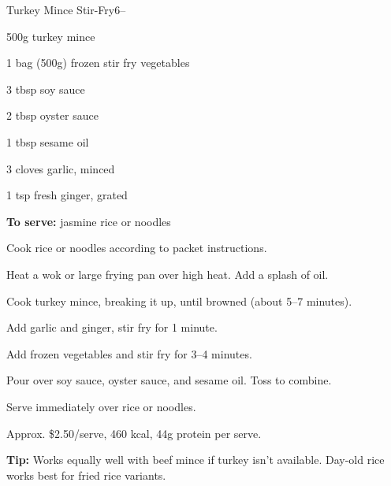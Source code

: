 \begin{recipebox}{Turkey Mince Stir-Fry}{6}{--}
\begin{ingredients}
  \item 500g turkey mince
  \item 1 bag (500g) frozen stir fry vegetables
  \item 3 tbsp soy sauce
  \item 2 tbsp oyster sauce
  \item 1 tbsp sesame oil
  \item 3 cloves garlic, minced
  \item 1 tsp fresh ginger, grated
  \item \textbf{To serve:} jasmine rice or noodles
\end{ingredients}

\begin{method}
  \item Cook rice or noodles according to packet instructions.
  \item Heat a wok or large frying pan over high heat. Add a splash of oil.
  \item Cook turkey mince, breaking it up, until browned (about 5--7 minutes).
  \item Add garlic and ginger, stir fry for 1 minute.
  \item Add frozen vegetables and stir fry for 3--4 minutes.
  \item Pour over soy sauce, oyster sauce, and sesame oil. Toss to combine.
  \item Serve immediately over rice or noodles.
\end{method}

\begin{notelist}
  \item Approx. \$2.50/serve, 460 kcal, 44g protein per serve.
  \item \textbf{Tip:} Works equally well with beef mince if turkey isn't available. Day-old rice works best for fried rice variants.
\end{notelist}
\end{recipebox}
